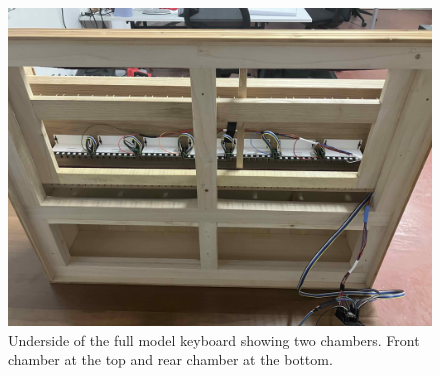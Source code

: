 



\begin{figure}  
  \centering
  \includegraphics[width=\linewidth]{src/images/49-key-bottom-sensors-no-keys.jpg} 
  \caption{Underside of the full model keyboard showing two chambers. Front chamber at the top and rear chamber at the bottom.} 
  \Description{} 
  \label{fig:49-key-bottom}
\end{figure}

